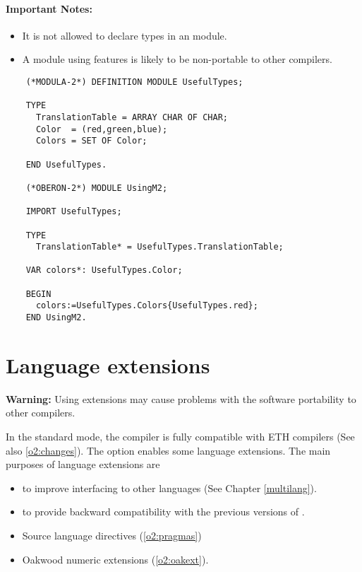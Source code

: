 \paragraph{Important Notes:}
\begin{itemize}
\item It is not allowed to declare \mt{} types in an \ot{} module.
\item A module using \mt{} features is likely to be non-portable to other compilers.
\end{itemize}

\Example
\begin{verbatim}
    (*MODULA-2*) DEFINITION MODULE UsefulTypes;

    TYPE
      TranslationTable = ARRAY CHAR OF CHAR;
      Color  = (red,green,blue);
      Colors = SET OF Color;

    END UsefulTypes.

    (*OBERON-2*) MODULE UsingM2;

    IMPORT UsefulTypes;

    TYPE
      TranslationTable* = UsefulTypes.TranslationTable;

    VAR colors*: UsefulTypes.Color;

    BEGIN
      colors:=UsefulTypes.Colors{UsefulTypes.red};
    END UsingM2.
\end{verbatim}

\section{Language extensions}\label{o2:ext}

{\bf Warning:}  Using extensions may cause problems with the software
portability to other compilers.

In the standard mode, the \xds{} \ot{} compiler is fully
compatible with ETH compilers (See also \ref{o2:changes}).
The  option enables some language extensions.
The main purposes of language extensions are
\begin{itemize}
\item to improve interfacing to other languages
     (See Chapter \ref{multilang}).
\item to provide backward compatibility with the previous versions
of \xds{}.
\end{itemize}

\Seealso
\begin{itemize}
\item         Source language directives (\ref{o2:pragmas})
\item         Oakwood numeric extensions (\ref{o2:oakext}).
\end{itemize}

